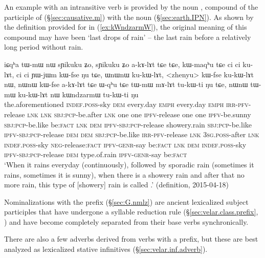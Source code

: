An example with an intransitive verb is provided by the noun , compound of the participle of  (§\ref{sec:causative.m}) with the noun  (§\ref{sec:earth.IPN}). As shown by the definition provided for  in (\ref{ex:kWndzarmW}), the original meaning of this compound may have been `last drops of rain' -- the last rain before a relatively long period without rain.

\begin{exe}
\ex \label{ex:kWndzarmW}
\gll  iɕqʰa tɯ-mɯ nɯ sɲikuku ʑo, sɲikuku ʑo a-kɤ-lɤt tɕe tɕe, kɯ-maqʰu tɕe ci ci ku-lɤt, ci ci ɲɯ-jɯm kɯ-fse ŋu tɕe, ɯnɯnɯ ku-kɯ-lɤt, <zhenyu> kɯ-fse ku-kɯ-lɤt nɯ, nɯnɯ kɯ-fse a-kɤ-lɤt tɕe ɯ-qʰu tɕe tɯ-mɯ mɤ-lɤt tu-kɯ-ti ŋu tɕe, nɯnɯ tɯ-mɯ ku-kɯ-lɤt nɯ kɯndzarmɯ tu-kɯ-ti ŋu \\
the.aforementioned \textsc{indef}.\textsc{poss}-sky \textsc{dem} every.day \textsc{emph} every.day \textsc{emph} \textsc{irr}-\textsc{pfv}-release \textsc{lnk} \textsc{lnk} \textsc{sbj}:\textsc{pcp}-be.after \textsc{lnk} one one \textsc{ipfv}-release one one \textsc{ipfv}-be.sunny \textsc{sbj}:\textsc{pcp}-be.like be:\textsc{fact} \textsc{lnk} \textsc{dem} \textsc{ipfv}-\textsc{sbj}:\textsc{pcp}-release showery.rain \textsc{sbj}:\textsc{pcp}-be.like \textsc{ipfv}-\textsc{sbj}:\textsc{pcp}-release  \textsc{dem} \textsc{dem} \textsc{sbj}:\textsc{pcp}-be.like \textsc{irr}-\textsc{pfv}-release \textsc{lnk} \textsc{3sg}.\textsc{poss}-after \textsc{lnk} \textsc{indef}.\textsc{poss}-sky \textsc{neg}-release:\textsc{fact} \textsc{ipfv}-\textsc{genr}-say be:\textsc{fact} \textsc{lnk} \textsc{dem} \textsc{indef}.\textsc{poss}-sky \textsc{ipfv}-\textsc{sbj}:\textsc{pcp}-release \textsc{dem} type.of.rain \textsc{ipfv}-\textsc{genr}-say be:\textsc{fact} \\
\glt `When it rains everyday (continuously), followed by sporadic rain (sometimes it rains, sometimes it is sunny), when there is a showery rain and after that no more rain, this type of [showery] rain is called .' (definition, 2015-04-18)
\end{exe}

Nominalizations with the  prefix (§\ref{sec:G.nmlz}) are ancient lexicalized subject participles that have undergone a syllable reduction rule (§\ref{sec:velar.class.prefix}, \citealt[6]{jacques14antipassive}) and have become completely separated from their base verbs synchronically.

There are also a few adverbs derived from verbs with a  prefix, but these are best analyzed as lexicalized stative infinitives (§\ref{sec:velar.inf.adverb}).

